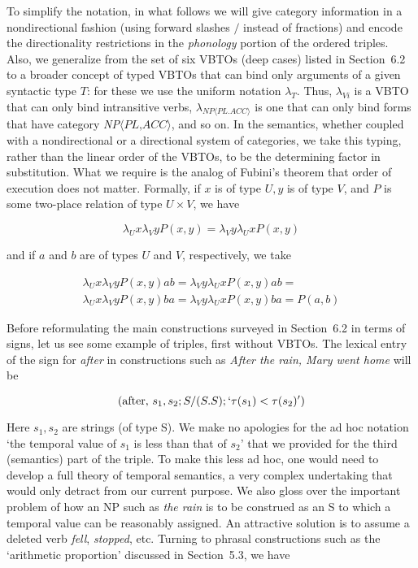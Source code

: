 To simplify the notation, in what follows we will give category information in
a nondirectional fashion (using forward slashes $/$ instead of fractions) and
encode the directionality restrictions in the {\it phonology} portion of the
ordered triples. Also, we generalize from the set of six VBTOs (deep cases)
listed in Section~6.2 to a broader concept of typed VBTOs that can bind only
arguments of a given syntactic type $T$: for these we use the uniform notation
$\lambda_T$. Thus, $\lambda_{Vi}$ is a VBTO that can only bind intransitive
verbs, $\lambda_{\textit{NP}\langle\textit{PL.ACC}\rangle}$ is one that can
only bind forms that have category {\it NP}$\langle\textit{PL,ACC}\rangle$,
and so on. In the semantics, whether coupled with a nondirectional or a
directional system of categories, we take this typing, rather than the linear
order of the VBTOs, to be the determining factor in substitution. What we
require is the analog of Fubini's theorem that order of execution does not
matter. Formally, if $x$ is of type $U, y$ is of type $V$, and $P$ is some
two-place relation of type $U \times V$, we have

\begin{equation}
\lambda_Ux \lambda_Vy P(x,y) = \lambda_Vy \lambda_Ux P(x,y)
\end{equation}

\smallskip\noindent
and if $a$ and $b$ are of types $U$ and $V$, respectively, we take 

\begin{eqnarray}
\lambda_Ux \lambda_Vy P(x,y)ab = \lambda_Vy \lambda_Ux P(x,y)ab =\\\nonumber
\lambda_Ux \lambda_Vy P(x,y)ba = \lambda_Vy \lambda_Ux P(x,y)ba=P(a,b)
\end{eqnarray}

\smallskip\noindent Before reformulating the main constructions surveyed in
Section~6.2 in terms of signs, let us see some example of triples, first
without VBTOs.  The lexical entry of the sign for {\it after} in constructions
such as {\it After the rain, Mary went home} will be

\begin{equation}
(\text{after, } s_1, s_2; S/(S.S); `\tau(s_1) < \tau(s_2)')
\end{equation}

\smallskip\noindent Here $s_1,s_2$ are strings (of type S). We make no
apologies for the ad hoc notation `the temporal value of $s_1$ is less than
that of $s_2$' that we provided for the third (semantics) part of the triple.
To make this less ad hoc, one would need to develop a full theory of temporal
semantics, a very complex undertaking that would only detract from our current
purpose. We also gloss over the important problem of how an NP such as {\it
  the rain} is to be construed as an S to which a temporal value can be
reasonably assigned. An attractive solution is to assume a deleted verb {\it
  fell}, {\it stopped}, etc. Turning to phrasal constructions such as the
`arithmetic proportion' discussed in Section~5.3, we have

